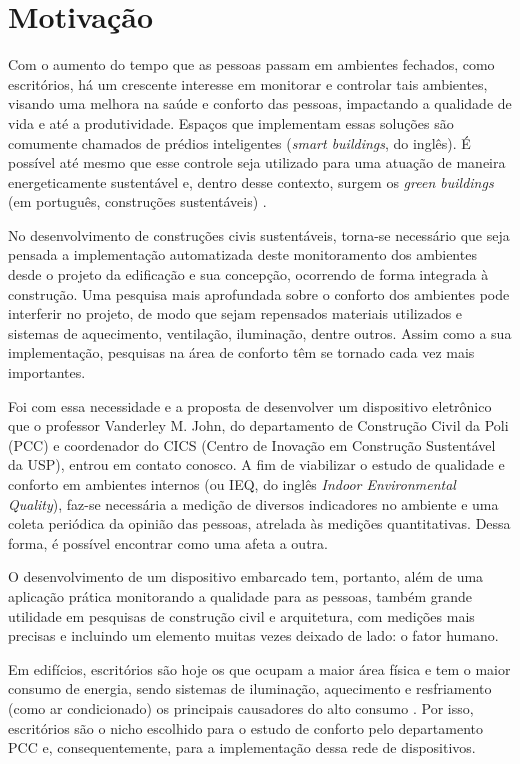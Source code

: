 \documentclass[../monografia.tex]{subfiles}
\begin{document}
\section{Motivação}

Com o aumento do tempo que as pessoas passam em ambientes fechados, como escritórios, há um crescente interesse em monitorar e controlar tais ambientes, visando uma melhora na saúde e conforto das pessoas, impactando a qualidade de vida e até a produtividade. Espaços que implementam essas soluções são comumente chamados de prédios inteligentes (\textit{smart buildings}, do inglês). É possível até mesmo que esse controle seja utilizado para uma atuação de maneira energeticamente sustentável e, dentro desse contexto, surgem os \textit{green buildings} (em português, construções sustentáveis) \cite{GreenBuildings} \cite{EnergyBuildings}.

No desenvolvimento de construções civis sustentáveis, torna-se necessário que seja pensada a implementação automatizada deste monitoramento dos ambientes desde o projeto da edificação e sua concepção, ocorrendo de forma integrada à construção. Uma pesquisa mais aprofundada sobre o conforto dos ambientes pode interferir no projeto, de modo que sejam repensados materiais utilizados e sistemas de aquecimento, ventilação, iluminação, dentre outros. Assim como a sua implementação, pesquisas na área de conforto têm se tornado cada vez mais importantes. 

Foi com essa necessidade e a proposta de desenvolver um dispositivo eletrônico que o professor Vanderley M. John, do departamento de Construção Civil da Poli (PCC) e coordenador do CICS (Centro de Inovação em Construção Sustentável da USP)\cite{CICS}, entrou em contato conosco. A fim de viabilizar o estudo de qualidade e conforto em ambientes internos (ou IEQ, do inglês \textit{Indoor Environmental Quality}), faz-se necessária a medição de diversos indicadores no ambiente e uma coleta periódica da opinião das pessoas, atrelada às medições quantitativas. Dessa forma, é possível encontrar como uma afeta a outra. 

O desenvolvimento de um dispositivo embarcado tem, portanto, além de uma aplicação prática monitorando a qualidade para as pessoas, também grande utilidade em pesquisas de construção civil e arquitetura, com medições mais precisas e incluindo um elemento muitas vezes deixado de lado: o fator humano.

Em edifícios, escritórios são hoje os que ocupam a maior área física e tem o maior consumo de energia, sendo sistemas de iluminação, aquecimento e resfriamento (como ar condicionado) os principais causadores do alto consumo \cite{EnergyBuildings}. Por isso, escritórios são o nicho escolhido para o estudo de conforto pelo departamento PCC e, consequentemente, para a implementação dessa rede de dispositivos. 
\end{document}
